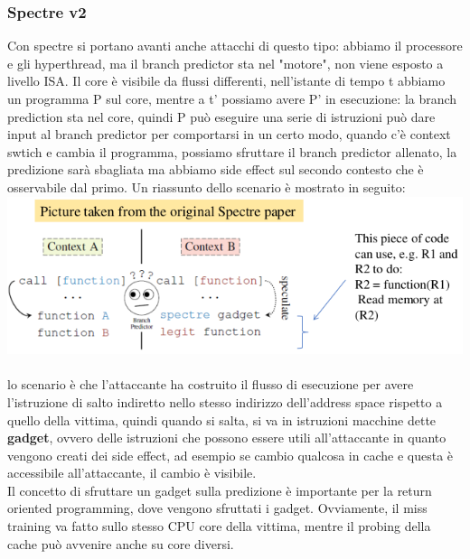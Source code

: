 \documentclass[12pt, oneside]{extbook}
\begin{document}
\subsubsection{Spectre v2}
Con spectre si portano avanti anche attacchi di questo tipo: abbiamo il processore e gli hyperthread, ma il branch predictor sta nel "motore", non viene esposto a livello ISA. Il core è visibile da flussi differenti, nell'istante di tempo t abbiamo un programma P sul core, mentre a t' possiamo avere P' in esecuzione: la branch prediction sta nel core, quindi P può eseguire una serie di istruzioni può dare input al branch predictor per comportarsi in un certo modo, quando c'è context swtich e cambia il programma, possiamo sfruttare il branch predictor allenato, la predizione sarà sbagliata ma abbiamo side effect sul secondo contesto che è osservabile dal primo. Un riassunto dello scenario è mostrato in seguito:\\
\includegraphics[scale=0.5]{immagini/spectrev2_branch_pred} \\\\
lo scenario è che l'attaccante ha costruito il flusso di esecuzione per avere l'istruzione di salto indiretto nello stesso indirizzo dell'address space rispetto a quello della vittima, quindi quando si salta, si va in istruzioni macchine dette \textbf{gadget}, ovvero delle istruzioni che possono essere utili all'attaccante in quanto vengono creati dei side effect, ad esempio se cambio qualcosa in cache e questa è accessibile all'attaccante, il cambio è visibile.\\ Il concetto di sfruttare un gadget sulla predizione è importante per la return oriented programming, dove vengono sfruttati i gadget. Ovviamente, il miss training va fatto sullo stesso CPU core della vittima, mentre il probing della cache può avvenire anche su core diversi.
\end{document}

